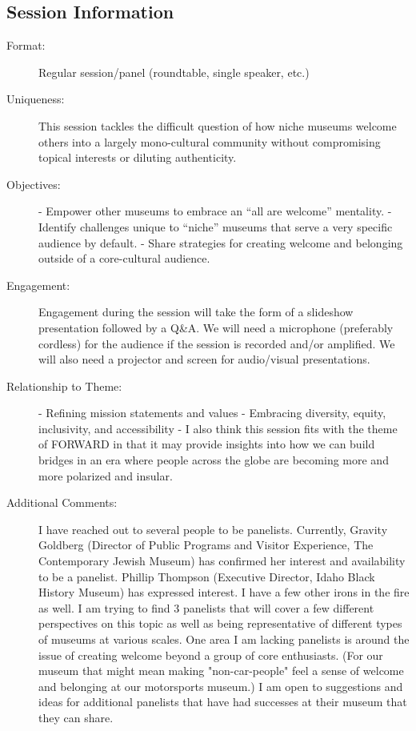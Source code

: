 \documentclass{report}
\begin{document}
              \subsection*{Session Information}
                \begin{description}
                  \item [Format:] Regular session/panel (roundtable, single speaker, etc.)
							    
							    \item [Uniqueness:]This session tackles the difficult question of how niche museums welcome others into a largely mono-cultural community without compromising topical interests or diluting authenticity.
							    \item [Objectives:]- Empower other museums to embrace an “all are welcome” mentality.
- Identify challenges unique to “niche” museums that serve a very specific audience by default.
- Share strategies for creating welcome and belonging outside of a core-cultural audience.
							    \item [Engagement:]Engagement during the session will take the form of a slideshow presentation followed by a Q\&A. We will need a microphone (preferably cordless) for the audience if the session is recorded and/or amplified. We will also need a projector and screen for audio/visual presentations.
							    \item [Relationship to Theme:]-	Refining mission statements and values
-	Embracing diversity, equity, inclusivity, and accessibility
-	I also think this session fits with the theme of FORWARD in that it may provide insights into how we can build bridges in an era where people across the globe are becoming more and more polarized and insular.
							    
                    \item [Additional Comments: ]I have reached out to several people to be panelists. Currently, Gravity Goldberg (Director of Public Programs and Visitor Experience, The Contemporary Jewish Museum) has confirmed her interest and availability to be a panelist. Phillip Thompson (Executive Director, Idaho Black History Museum) has expressed interest. I have a few other irons in the fire as well. I am trying to find 3 panelists that will cover a few different perspectives on this topic as well as being representative of different types of museums at various scales. One area I am lacking panelists is around the issue of creating welcome beyond a group of core enthusiasts. (For our museum that might mean making "non-car-people" feel a sense of welcome and belonging at our motorsports museum.) I am open to suggestions and ideas for additional panelists that have had successes at their museum that they can share.

                \end{description}
\end{document}

